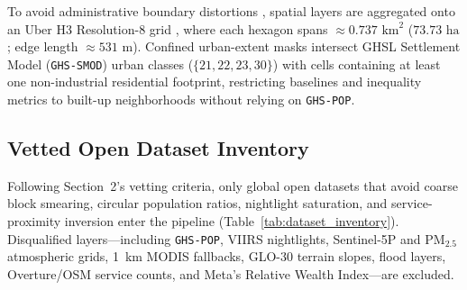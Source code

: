 To avoid administrative boundary distortions \citep{Openshaw1984}, spatial layers are aggregated onto an Uber H3 Resolution-8 grid \citep{Sahr2003}, where each hexagon spans $\approx 0.737\text{ km}^2$ ($73.73\text{ ha}$; edge length $\approx 531\text{ m}$). Confined urban-extent masks intersect GHSL Settlement Model (\texttt{GHS-SMOD}) urban classes ($\{21, 22, 23, 30\}$) with cells containing at least one non-industrial residential footprint, restricting baselines and inequality metrics to built-up neighborhoods without relying on \texttt{GHS-POP}.

\subsection{Vetted Open Dataset Inventory}
Following Section~2's vetting criteria, only global open datasets that avoid coarse block smearing, circular population ratios, nightlight saturation, and service-proximity inversion enter the pipeline (Table~\ref{tab:dataset_inventory}). Disqualified layers---including \texttt{GHS-POP}, VIIRS nightlights, Sentinel-5P and $\text{PM}_{2.5}$ atmospheric grids, 1~km MODIS fallbacks, GLO-30 terrain slopes, flood layers, Overture/OSM service counts, and Meta's Relative Wealth Index---are excluded.

